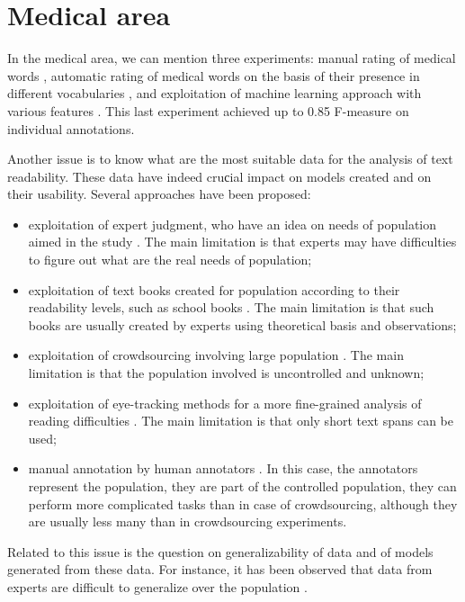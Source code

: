 \section{Medical area}
In the medical area, we can mention three experiments: manual rating
of medical words \citep{Zheng-AMIA2002}, automatic rating of medical
words on the basis of their presence in different vocabularies
\citep{Borst-MIE2008}, and exploitation of machine learning approach
with various features \citep{Grabar-PITR2014}. This last experiment
achieved up to 0.85 F-measure on individual annotations.

Another issue is to know what are the most suitable data for the
analysis of text readability. These data have indeed cruсial impact on
models created and on their usability.  Several approaches have been
proposed:
\begin{itemize}
\item exploitation of expert judgment, who have an idea on needs of
  population aimed in the study \citep{DeClerc-NLE2014}. The main
  limitation is that experts may have difficulties to figure out what
  are the real needs of population;
\item exploitation of text books created for population according to
  their readability levels, such as school books
  \citep{Gala-ELEX2013}. The main limitation is that such books are
  usually created by experts using theoretical basis and observations;
\item exploitation of crowdsourcing involving large population
  \citep{DeClerc-NLE2014}.  The main limitation is that the
  population involved is uncontrolled and unknown;
\item exploitation of eye-tracking methods for a more fine-grained
  analysis of reading difficulties
  \citep{Yaneva-CCA2015,Grabar-ICHI2018}.  The main limitation is that
  only short text spans can be used;
\item manual annotation by human annotators
  \citep{Grabar-LREC2016t}. In this case, the annotators represent the
  population, they are part of the controlled population, they can
  perform more complicated tasks than in case of crowdsourcing,
  although they are usually less many than in crowdsourcing
  experiments.
\end{itemize}
Related to this issue is the question on generalizability of data and
of models generated from these data.  For instance, it has been
observed that data from experts are difficult to generalize over the
population \citep{DeClerc-NLE2014}.
